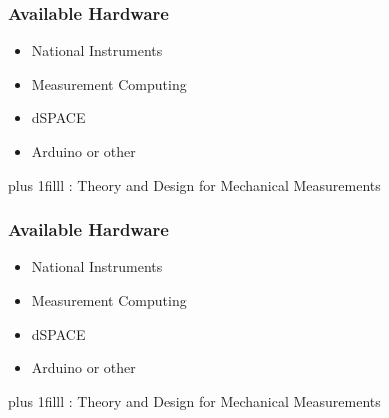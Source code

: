 \documentclass[fleqn]{beamer} %
\newcommand{\sectionIIsubsectionIIItitle}{Available Hardware}
\newcommand{\btVFill}{\vskip0pt plus 1filll}
\begin{document}
			\begin{frame}
				\frametitle{\sectionIIsubsectionIIItitle} 

				\bigskip

				\begin{itemize}
					
					\item National Instruments \vspace{6mm}\\
					
					\item Measurement Computing  \vspace{6mm}\\
					
					\item dSPACE  \vspace{6mm}\\
					
					\item Arduino or other 
					
				\end{itemize}

				\btVFill
				\tiny{ : Theory and Design for Mechanical Measurements}

			\end{frame}

			\begin{frame}
				\frametitle{\sectionIIsubsectionIIItitle}

				\bigskip

				\begin{itemize}
					\item National Instruments \vspace{6mm}\\
					
					\item Measurement Computing  \vspace{6mm}\\
					
					\item dSPACE  \vspace{6mm}\\
					
					\item Arduino or other 
					
				\end{itemize}

				\btVFill
				\tiny{: Theory and Design for Mechanical Measurements}	
			
			\end{frame}
\end{document}
